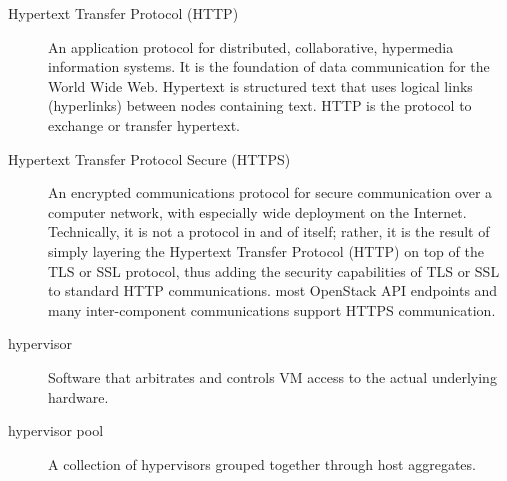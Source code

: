 \documentclass[letterpaper,10pt,english]{sphinxmanual}
\begin{document}
\begin{description}
\item[{Hypertext Transfer Protocol (HTTP)}] \leavevmode{}\label{_source/glossary:term-hypertext-transfer-protocol-http}
An application protocol for distributed, collaborative,
hypermedia information systems. It is the foundation of data
communication for the World Wide Web. Hypertext is structured
text that uses logical links (hyperlinks) between nodes containing
text. HTTP is the protocol to exchange or transfer hypertext.

\item[{Hypertext Transfer Protocol Secure (HTTPS)}] \leavevmode{}\label{_source/glossary:term-hypertext-transfer-protocol-secure-https}
An encrypted communications protocol for secure communication
over a computer network, with especially wide deployment on the
Internet. Technically, it is not a protocol in and of itself;
rather, it is the result of simply layering the Hypertext Transfer
Protocol (HTTP) on top of the TLS or SSL protocol, thus adding the
security capabilities of TLS or SSL to standard HTTP communications.
most OpenStack API endpoints and many inter-component communications
support HTTPS communication.

\item[{hypervisor}] \leavevmode{}\label{_source/glossary:term-hypervisor}
Software that arbitrates and controls VM access to the actual
underlying hardware.

\item[{hypervisor pool}] \leavevmode{}\label{_source/glossary:term-hypervisor-pool}
A collection of hypervisors grouped together through host
aggregates.

\end{description}
\end{document}
